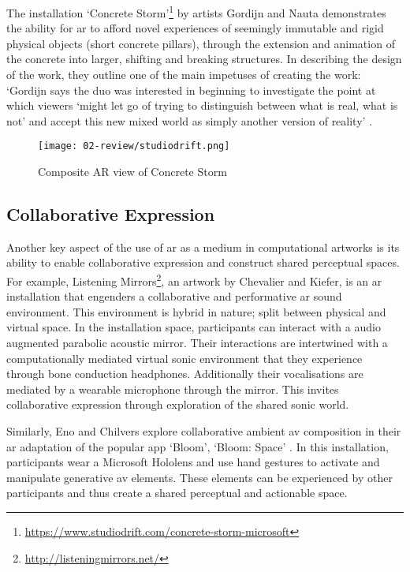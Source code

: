 The installation `Concrete Storm'\footnote{\url{https://www.studiodrift.com/concrete-storm-microsoft}} by artists Gordijn and Nauta demonstrates the ability for \gls{ar} to afford novel experiences of seemingly immutable and rigid physical objects (short concrete pillars), through the extension and animation of the concrete into larger, shifting and breaking structures. In describing the design of the work, they outline one of the main impetuses of creating the work: `Gordijn says the duo was interested in beginning to investigate the point at which viewers `might let go of trying to distinguish between what is real, what is not' and accept this new mixed world as simply another version of reality' \citep{gottschalk2017}. 

\begin{figure}[ht]
    \centering
    \texttt{[image: 02-review/studiodrift.png]}
    \captionsetup{justification=centering,margin=1.5cm}
    \caption{Composite AR view of Concrete Storm \citep[from][]{gordijn2017}}
\end{figure}\label{fig: concretestorm}

\subsection{Collaborative Expression}\label{sec: ar-arts-collaboration}
Another key aspect of the use of \gls{ar} as a medium in computational artworks is its ability to enable collaborative expression and construct shared perceptual spaces. For example, Listening Mirrors\footnote{\url{http://listeningmirrors.net/}}, an artwork by Chevalier and Kiefer, \citeyearpar{chevalier2018} is an \gls{ar} installation that engenders a collaborative and performative \gls{ar} sound environment. This environment is hybrid in nature; split between physical and virtual space. In the installation space, participants can interact with a audio augmented parabolic acoustic mirror. Their interactions are intertwined with a computationally mediated virtual sonic environment that they experience through bone conduction headphones. Additionally their vocalisations are mediated by a wearable microphone through the mirror. This invites collaborative expression through exploration of the shared sonic world.

Similarly, Eno and Chilvers explore collaborative ambient \gls{av} composition in their \gls{ar} adaptation of the popular app `Bloom', `Bloom: Space' \citep{eno2018}. In this installation, participants wear a Microsoft Hololens and use hand gestures to activate and manipulate generative \gls{av} elements. These elements can be experienced by other participants and thus create a shared perceptual and actionable space.

